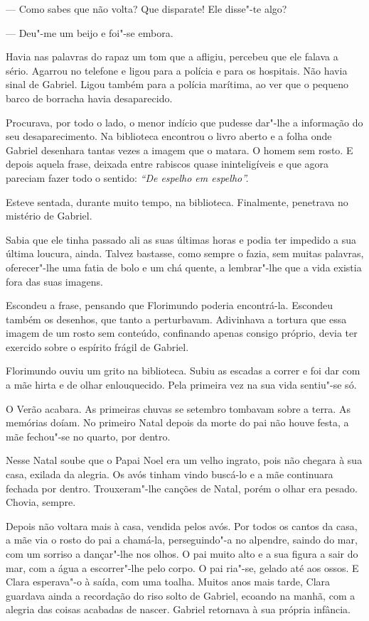--- Como sabes que não volta? Que disparate! Ele disse"-te algo?

--- Deu"-me um beijo e foi"-se embora.

Havia nas palavras do rapaz um tom que a afligiu, percebeu que ele
falava a sério. Agarrou no telefone e ligou para a polícia e para os
hospitais. Não havia sinal de Gabriel. Ligou também para a polícia
marítima, ao ver que o pequeno barco de borracha havia desaparecido.

Procurava, por todo o lado, o menor indício que pudesse dar"-lhe a
informação do seu desaparecimento. Na biblioteca encontrou o livro
aberto e a folha onde Gabriel desenhara tantas vezes a imagem que o
matara. O homem sem rosto. E depois aquela frase, deixada entre rabiscos
quase ininteligíveis e que agora pareciam fazer todo o sentido:
\emph{``De espelho em espelho''.}

Esteve sentada, durante muito tempo, na biblioteca. Finalmente,
penetrava no mistério de Gabriel.

Sabia que ele tinha passado ali as suas últimas horas e podia ter
impedido a sua última loucura, ainda. Talvez bastasse, como sempre o
fazia, sem muitas palavras, oferecer"-lhe uma fatia de bolo e um chá
quente, a lembrar"-lhe que a vida existia fora das suas imagens.

Escondeu a frase, pensando que Florimundo poderia encontrá-la. Escondeu
também os desenhos, que tanto a perturbavam. Adivinhava a tortura que
essa imagem de um rosto sem conteúdo, confinando apenas consigo próprio,
devia ter exercido sobre o espírito frágil de Gabriel.

Florimundo ouviu um grito na biblioteca. Subiu as escadas a correr e foi
dar com a mãe hirta e de olhar enlouquecido. Pela primeira vez na sua
vida sentiu"-se só.

O Verão acabara. As primeiras chuvas se setembro tombavam sobre a terra.
As memórias doíam. No primeiro Natal depois da morte do pai não houve
festa, a mãe fechou"-se no quarto, por dentro.

Nesse Natal soube que o Papai Noel era um velho ingrato, pois não chegara
à sua casa, exilada da alegria. Os avós tinham vindo buscá-lo e a mãe
continuara fechada por dentro. Trouxeram"-lhe canções de Natal, porém o
olhar era pesado. Chovia, sempre.

Depois não voltara mais à casa, vendida pelos avós. Por todos os cantos
da casa, a mãe via o rosto do pai a chamá-la, perseguindo"-a no alpendre,
saindo do mar, com um sorriso a dançar"-lhe nos olhos. O pai muito alto e
a sua figura a sair do mar, com a água a escorrer"-lhe pelo corpo. O pai
ria"-se, gelado até aos ossos. E Clara esperava"-o à saída, com uma
toalha. Muitos anos mais tarde, Clara guardava ainda a recordação do
riso solto de Gabriel, ecoando na manhã, com a alegria das coisas
acabadas de nascer. Gabriel retornava à sua própria infância.

